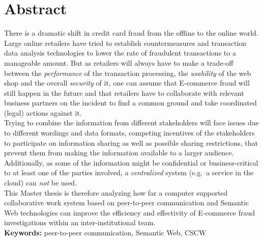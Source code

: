 
\chapter*{Abstract}

There is a dramatic shift in credit card fraud from the offline to the online world. Large online retailers have tried to establish countermeasures and transaction data analysis technologies to lower the rate of fraudulent transactions to a manageable amount. But as retailers will always have to make a trade-off between the \emph{performance} of the transaction processing, the \emph{usability} of the web shop and the overall \emph{security} of it, one can assume that \gls{E-commerce} fraud will still happen in the future and that retailers have to collaborate with relevant business partners on the incident to find a common ground and take coordinated (legal) actions against it. \\

Trying to combine the information from different stakeholders will face issues due to different wordings and data formats, competing incentives of the stakeholders to participate on information sharing as well as possible sharing restrictions, that prevent them from making the information available to a larger audience. Additionally, as some of the information might be confidential or business-critical to at least one of the parties involved, a \emph{centralized} system (e.g.\ a service in the cloud) can \emph{not} be used. \\

This Master thesis is therefore analyzing how far a computer supported collaborative work system based on peer-to-peer communication and Semantic Web technologies can improve the efficiency and effectivity of \gls{E-commerce} fraud investigations within an inter-institutional team. \\[2em]

\textbf{Keywords:} peer-to-peer communication, Semantic Web, CSCW
